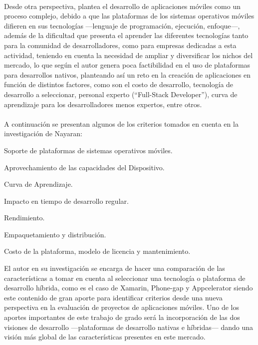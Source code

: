 \\
Desde otra perspectiva, \citet{Narayan2014Mobile} plantea el desarrollo de aplicaciones móviles como un proceso complejo, debido a que las plataformas de los sistemas operativos móviles difieren en sus tecnologías ---lenguaje de programación, ejecución, enfoque---, además de la dificultad que presenta el aprender las diferentes tecnologías tanto para la comunidad de desarrolladores, como para empresas dedicadas a esta actividad, teniendo en cuenta la necesidad de ampliar y diversificar los nichos del mercado, lo que según el autor genera poca factibilidad en el uso de plataformas para desarrollos nativos, planteando así un reto en la creación de aplicaciones en función de distintos factores, como son el costo de desarrollo, tecnología de desarrollo a seleccionar, personal experto (``Full-Stack Developer''), curva de aprendizaje para los desarrolladores menos expertos, entre otros.\\
\\
A continuación se presentan algunos de los criterios tomados en cuenta en la investigación de Nayaran:
\\
\begin{viñetas}
\item Soporte de plataformas de sistemas operativos móviles.
\item Aprovechamiento de las capacidades del Dispositivo.
\item Curva de Aprendizaje.
\item Impacto en tiempo de desarrollo regular.
\item Rendimiento.
\item Empaquetamiento y distribución.
\item Costo de la plataforma, modelo de licencia y mantenimiento.
\\
\end{viñetas}
El autor en su investigación se encarga de hacer una comparación de las características a tomar en cuenta al seleccionar una tecnología o plataforma de desarrollo híbrida, como es el caso de Xamarin, Phone-gap y Appcelerator  siendo este contenido de gran aporte para identificar criterios desde una nueva perspectiva en la evaluación de proyectos de aplicaciones móviles. Uno de los aportes importantes de este trabajo de grado será la incorporación de las dos visiones de desarrollo ---plataformas de desarrollo nativas e híbridas--- dando una visión más global de las características presentes en este mercado.\\
\\
